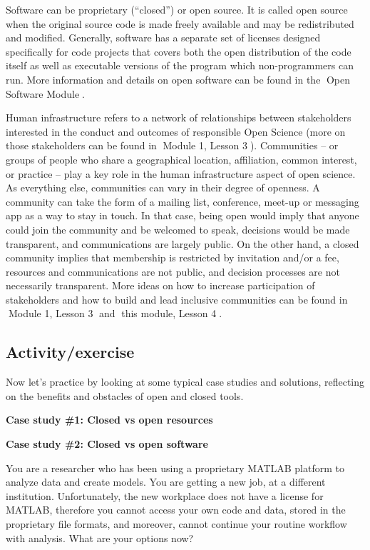 \documentclass[
  letterpaper,
  DIV=11,
  numbers=noendperiod]{scrreport}
\begin{document}
Software can be proprietary (``closed'') or open source. It is called
open source when the original source code is made freely available and
may be redistributed and modified. Generally, software has a separate
set of licenses designed specifically for code projects that covers both
the open distribution of the code itself as well as executable versions
of the program which non-programmers can run. More information and
details on open software can be found in the 🔗Open Software Module🔗.

Human infrastructure refers to a network of relationships between
stakeholders interested in the conduct and outcomes of responsible Open
Science (more on those stakeholders can be found in 🔗Module 1, Lesson
3🔗). Communities -- or groups of people who share a geographical
location, affiliation, common interest, or practice -- play a key role
in the human infrastructure aspect of open science. As everything else,
communities can vary in their degree of openness. A community can take
the form of a mailing list, conference, meet-up or messaging app as a
way to stay in touch. In that case, being open would imply that anyone
could join the community and be welcomed to speak, decisions would be
made transparent, and communications are largely public. On the other
hand, a closed community implies that membership is restricted by
invitation and/or a fee, resources and communications are not public,
and decision processes are not necessarily transparent. More ideas on
how to increase participation of stakeholders and how to build and lead
inclusive communities can be found in 🔗Module 1, Lesson 3🔗 and 🔗this
module, Lesson 4🔗.

\hypertarget{activityexercise-1}{%
\subsection*{Activity/exercise}\label{activityexercise-1}}

Now let's practice by looking at some typical case studies and
solutions, reflecting on the benefits and obstacles of open and closed
tools.

\textbf{Case study \#1: Closed vs open resources}

\textbf{Case study \#2: Closed vs open software}

You are a researcher who has been using a proprietary MATLAB platform to
analyze data and create models. You are getting a new job, at a
different institution. Unfortunately, the new workplace does not have a
license for MATLAB, therefore you cannot access your own code and data,
stored in the proprietary file formats, and moreover, cannot continue
your routine workflow with analysis. What are your options now?
\end{document}

